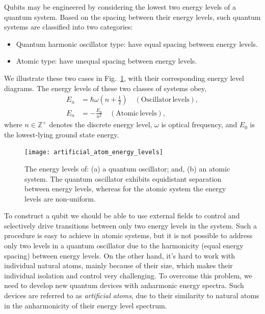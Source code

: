 Qubits may be engineered by considering the lowest two energy levels of a quantum system. Based on the spacing between their energy levels, such quantum systems are classified into two categories:
\begin{itemize}
	\item Quantum harmonic oscillator type: have equal spacing between energy levels.
	\item Atomic type: have unequal spacing between energy levels.
\end{itemize}
We illustrate these two cases in Fig.~\ref{fig:artificial_atom_energy_levels}, with their corresponding energy level diagrams. The energy levels of these two classes of systems obey,
\begin{align}
E_{n} &= \hbar \omega \left(n+\frac{1}{2}\right) \quad (\mathrm{Oscillator\,levels}), \nonumber \\ 
E_{n} &= -\frac{E_{0}}{n^{2}} \quad (\mathrm{Atomic\,levels}),
\end{align}
where \mbox{$n\in\mathbb{Z}^+$} denotes the discrete energy level, $\omega$ is optical frequency, and $E_0$ is the lowest-lying ground state energy.

\begin{figure}[!htbp]
\texttt{[image: artificial\_atom\_energy\_levels]}
\captionspacefig \caption{The energy levels of: (a) a quantum oscillator; and, (b) an atomic system. The quantum oscillator exhibits equidistant separation between energy levels, whereas for the atomic system the energy levels are non-uniform.}\label{fig:artificial_atom_energy_levels}
\end{figure}

To construct a qubit we should be able to use external fields to control and selectively drive transitions between only two energy levels in the system. Such a procedure is easy to achieve in atomic systems, but it is not possible to address only two levels in a quantum oscillator due to the harmonicity (equal energy spacing) between energy levels. On the other hand, it's hard to work with individual natural atoms, mainly because of their size, which makes their individual isolation and control very challenging. To overcome this problem, we need to develop new quantum devices with anharmonic energy spectra. Such devices are referred to as \textit{artificial atoms}, due to their similarity to natural atoms in the anharmonicity of their energy level spectrum.

